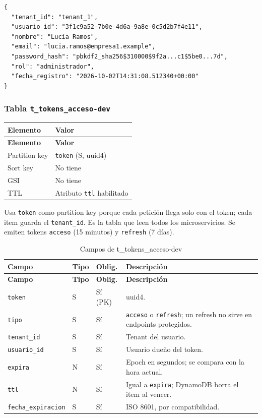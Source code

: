 \begin{lstlisting}
{
  "tenant_id": "tenant_1",
  "usuario_id": "3f1c9a52-7b0e-4d6a-9a8e-0c5d2b7f4e11",
  "nombre": "Lucía Ramos",
  "email": "lucia.ramos@empresa1.example",
  "password_hash": "pbkdf2_sha256$310000$9f2a...c1$5be0...7d",
  "rol": "administrador",
  "fecha_registro": "2026-10-02T14:31:08.512340+00:00"
}
\end{lstlisting}

\subsubsection{Tabla \texttt{t\_tokens\_acceso-dev}}
\begin{longtable}{p{3.5cm}p{10.5cm}}
\toprule
\textbf{Elemento} & \textbf{Valor} \\
\midrule
\endfirsthead
\toprule
\textbf{Elemento} & \textbf{Valor} \\
\midrule
\endhead
\bottomrule
\endlastfoot
Partition key & \texttt{token} (S, uuid4) \\
Sort key & No tiene \\
GSI & No tiene \\
TTL & Atributo \texttt{ttl} habilitado \\
\end{longtable}

Usa \texttt{token} como partition key porque cada petición llega solo con el token; cada item guarda el \texttt{tenant\_\allowbreak{}id}. Es la tabla que leen todos los microservicios. Se emiten tokens \texttt{acceso} (15 minutos) y \texttt{refresh} (7 días).

\begin{longtable}{p{3.4cm}p{1.2cm}p{1.4cm}p{8cm}}
\caption{Campos de t\_tokens\_acceso-dev}\\
\toprule
\textbf{Campo} & \textbf{Tipo} & \textbf{Oblig.} & \textbf{Descripción} \\
\midrule
\endfirsthead
\toprule
\textbf{Campo} & \textbf{Tipo} & \textbf{Oblig.} & \textbf{Descripción} \\
\midrule
\endhead
\bottomrule
\endlastfoot
\texttt{token} & S & Sí (PK) & uuid4. \\
\texttt{tipo} & S & Sí & \texttt{acceso} o \texttt{refresh}; un refresh no sirve en endpoints protegidos. \\
\texttt{tenant\_\allowbreak{}id} & S & Sí & Tenant del usuario. \\
\texttt{usuario\_\allowbreak{}id} & S & Sí & Usuario dueño del token. \\
\texttt{expira} & N & Sí & Epoch en segundos; se compara con la hora actual. \\
\texttt{ttl} & N & Sí & Igual a \texttt{expira}; DynamoDB borra el item al vencer. \\
\texttt{fecha\_\allowbreak{}expiracion} & S & Sí & ISO 8601, por compatibilidad. \\
\end{longtable}

